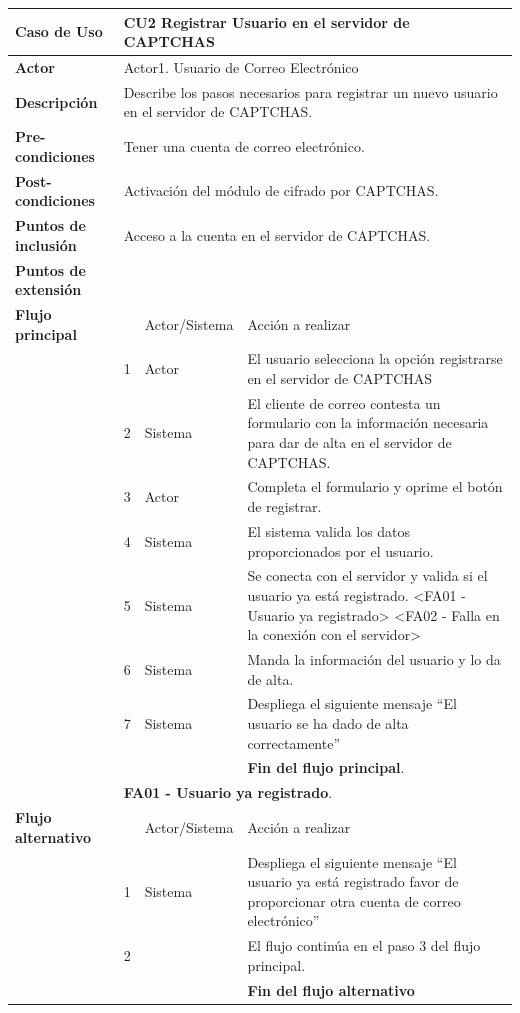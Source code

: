 \documentclass[12pt,oneside,onecolumn,openany]{report}
\begin{document}
 \begin{longtable}[H]{| p{} | p{} |p{4cm}|p{5cm}|}%
     \hline
     \textbf{Caso de Uso} &\multicolumn{3}{|l|}{CU2 Registrar Usuario en el servidor de CAPTCHAS}\\
     \hline
     \textbf{Actor} & \multicolumn{3}{|l|}{Actor1. Usuario de Correo Electrónico}\\
     \hline
     \textbf{Descripción} & \multicolumn{3}{|p{10cm}|}{Describe los pasos necesarios para registrar un nuevo usuario en el servidor de CAPTCHAS.}\\
     \hline
     \textbf{Pre-condiciones} & \multicolumn{3}{|l|}{Tener una cuenta de correo electrónico.}\\
     \hline
     \textbf{Post-condiciones} & \multicolumn{3}{|l|}{Activación del módulo de cifrado por CAPTCHAS.}\\
     \hline
     \textbf{Puntos de inclusión} & \multicolumn{3}{|l|}{Acceso a la cuenta en el servidor de CAPTCHAS.}\\
     \hline
     \textbf{Puntos de extensión} & \multicolumn{3}{|l|}{}\\
     \hline
     \textbf{Flujo principal} & & Actor/Sistema & Acción a realizar\\
     \hline
     & 1 & Actor & El usuario selecciona la opción registrarse en el servidor de CAPTCHAS\\
     \hline
     & 2 & Sistema & El cliente de correo contesta un formulario con la información necesaria para dar de alta en el servidor de CAPTCHAS.\\
     \hline
     & 3 & Actor & Completa el formulario y oprime el botón de registrar.\\
     \hline
     & 4 & Sistema & El sistema valida los datos proporcionados por el usuario.\\
     \hline
     & 5 & Sistema & Se conecta con el servidor y valida si el usuario ya está registrado. <FA01 - Usuario ya registrado> <FA02 - Falla en la conexión con el servidor>\\
     \hline
     & 6 & Sistema & Manda la información del usuario y lo da de alta.\\
     \hline
     & 7 & Sistema & Despliega el siguiente mensaje ``El usuario se ha dado de alta correctamente''\\
     \hline
     & & & \textbf{Fin del flujo principal}.\\
     \hline
     & \multicolumn{3}{|l|}{\textbf{FA01 - Usuario ya registrado}.}\\
     \hline
     \textbf{Flujo alternativo} & & Actor/Sistema & Acción a realizar\\
     \hline
     & 1 & Sistema & Despliega el siguiente mensaje  ``El usuario ya está registrado favor de proporcionar otra cuenta de correo electrónico''\\
     \hline
     & 2 & & El flujo continúa en el paso 3 del flujo principal.\\
     \hline
     &  & & \textbf{Fin del flujo alternativo}\\
     \hline
     

\end{longtable}
\end{document}
